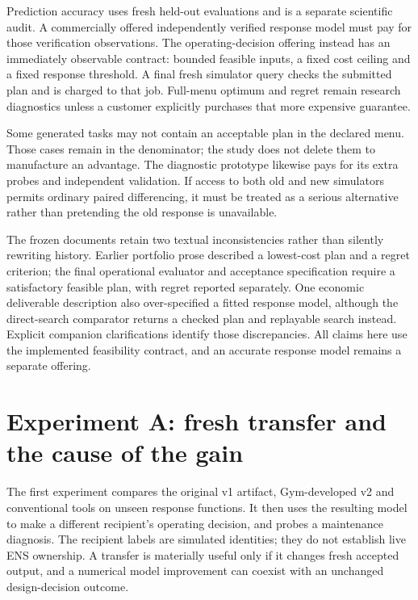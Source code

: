 \documentclass[11pt,letterpaper]{article}
\begin{document}
Prediction accuracy uses fresh held-out evaluations and is a separate scientific audit. A commercially offered independently verified response model must pay for those verification observations. The operating-decision offering instead has an immediately observable contract: bounded feasible inputs, a fixed cost ceiling and a fixed response threshold. A final fresh simulator query checks the submitted plan and is charged to that job. Full-menu optimum and regret remain research diagnostics unless a customer explicitly purchases that more expensive guarantee.

Some generated tasks may not contain an acceptable plan in the declared menu. Those cases remain in the denominator; the study does not delete them to manufacture an advantage. The diagnostic prototype likewise pays for its extra probes and independent validation. If access to both old and new simulators permits ordinary paired differencing, it must be treated as a serious alternative rather than pretending the old response is unavailable.

The frozen documents retain two textual inconsistencies rather than silently rewriting history. Earlier portfolio prose described a lowest-cost plan and a regret criterion; the final operational evaluator and acceptance specification require a satisfactory feasible plan, with regret reported separately. One economic deliverable description also over-specified a fitted response model, although the direct-search comparator returns a checked plan and replayable search instead. Explicit companion clarifications identify those discrepancies. All claims here use the implemented feasibility contract, and an accurate response model remains a separate offering.

\section{Experiment A: fresh transfer and the cause of the gain}

The first experiment compares the original v1 artifact, Gym-developed v2 and conventional tools on unseen response functions. It then uses the resulting model to make a different recipient's operating decision, and probes a maintenance diagnosis. The recipient labels are simulated identities; they do not establish live ENS ownership. A transfer is materially useful only if it changes fresh accepted output, and a numerical model improvement can coexist with an unchanged design-decision outcome.


\end{document}
